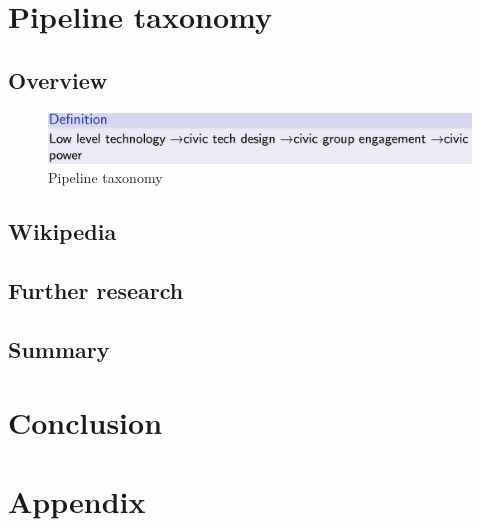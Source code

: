 \documentclass{article}
\begin{document}
\section*{Pipeline taxonomy}

        \subsection*{Overview}
        

			\begin{figure}[h]
				\centering
				\includegraphics[scale=0.5]{images/taxonomy-pipeline}
				\caption{Pipeline taxonomy}
				\label{fig:taxonomy-pipeline}
			\end{figure}

        \subsection*{Wikipedia}
        

        \subsection*{Further research}
        
                
        \subsection*{Summary}
        
               
\section*{Conclusion}


\pagebreak
{}              
\section*{Appendix}

\pagebreak
{}              
 

\end{document}
